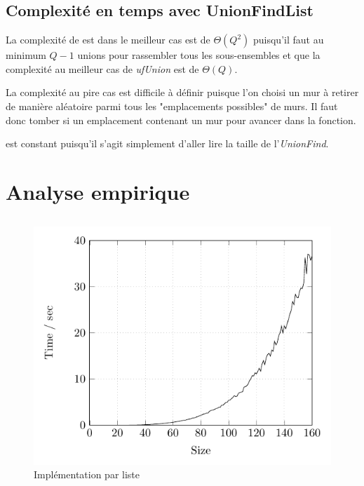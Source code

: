 \subsection{Complexité en temps avec UnionFindList} %
La complexité de  est dans le meilleur cas est de $\Theta(Q^2)$ puisqu'il faut au minimum $Q-1$ unions pour rassembler tous les sous-ensembles et que la complexité au meilleur cas de \textit{ufUnion} est de $\Theta(Q)$.

La complexité au pire cas est difficile à définir puisque l'on choisi un mur à retirer de manière aléatoire parmi tous les "emplacements possibles" de murs. Il faut donc tomber si un emplacement contenant un mur pour avancer dans la fonction.




\bigbreak
{} est constant puisqu'il s'agit simplement d'aller lire la taille de l'\textit{UnionFind}.

\section{Analyse empirique}
\subsection{} %
	\begin{figure}[h]
		\caption{Implémentation par liste}
		\includegraphics{Tests/List/list}
	\end{figure}


